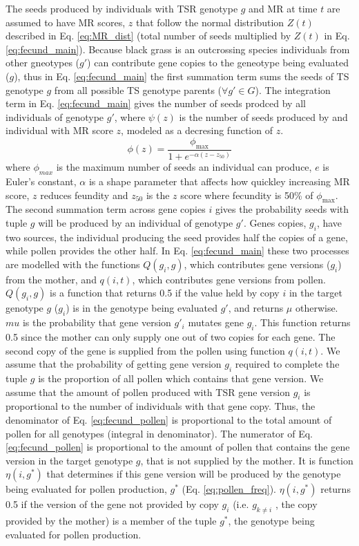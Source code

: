 \documentclass[12pt, a4paper]{article}
\begin{document}
The seeds produced by individuals with TSR genotype $g$ and MR at time $t$ are assumed to have MR scores, $z$ that follow the normal distribution $Z(t)$ described in Eq. \ref{eq:MR_dist} (total number of seeds multiplied by $Z(t)$ in Eq. \ref{eq:fecund_main}). Because black grass is an outcrossing species individuals from other gneotypes ($g'$) can contribute gene copies to the geneotype being evaluated ($g$), thus in Eq. \ref{eq:fecund_main} the first summation term sums the seeds of TS genotype $g$ from all possible TS genotype parents ($\forall g' \in G$). The integration term in Eq. \ref{eq:fecund_main} gives the number of seeds prodced by all individuals of genotype $g'$, where $\psi(z)$ is the number of seeds produced by and individual with MR score $z$, modeled as a decresing function of $z$.
\begin{equation}\label{eq:fecund_seed_num}
	\phi(z) = \frac{\phi_\text{max}}{1 + e^{-\alpha(z - z_{50})}}
\end{equation}         
where $\phi_{max}$ is the maximum number of seeds an individual can produce, $e$ is Euler's constant, $\alpha$ is a shape parameter that affects how quickley increasing MR score, $z$ reduces feundity and $z_{50}$ is the $z$ score where fecundity is 50\% of $\phi_\text{max}$. The second summation term across gene copies $i$ gives the probability seeds with tuple $g$ will be produced by an individual of genotype $g'$. Genes copies, $g_i$, have two sources, the individual producing the seed provides half the copies of a gene, while pollen provides the other half. In Eq. \ref{eq:fecund_main} these two processes are modelled with the functions $Q(g_i, g)$, which contributes gene versions ($g_i$) from the mother, and $q(i, t)$, which contributes gene versions from pollen. $Q(g_i, g)$ is a function that returns 0.5 if the value held by copy $i$ in the target genotype $g$ ($g_i$) is in the genotype being evaluated $g'$, and returns $\mu$ otherwise. $mu$ is the probability that gene version $g'_i$ mutates gene $g_i$. This function returns 0.5 since the mother can only supply one out of two copies for each gene. The second copy of the gene is supplied from the pollen using function $q(i, t)$. We assume that the probability of getting gene version $g_i$ required to complete the tuple $g$ is the proportion of all pollen which contains that gene version. We assume that the amount of pollen produced with TSR gene version $g_i$ is proportional to the number of individuals with that gene copy. Thus, the denominator of Eq. \ref{eq:fecund_pollen} is proportional to the total amount of pollen for all genotypes (integral in denominator). The numerator of Eq. \ref{eq:fecund_pollen} is proportional to the amount of pollen that contains the gene version in the target genotype $g$, that is not supplied by the mother. It is function $\eta(i, g^*)$ that determines if this gene version will be produced by the genotype being evaluated for pollen production, $g^*$ (Eq. \ref{eq:pollen_freq}). $\eta(i, g^*)$ returns 0.5 if the version of the gene not provided by copy $g_i$ (i.e. $g_{k \neq i}$ , the copy provided by the mother) is a member of the tuple $g^*$, the genotype being evaluated for pollen production.
\end{document}
